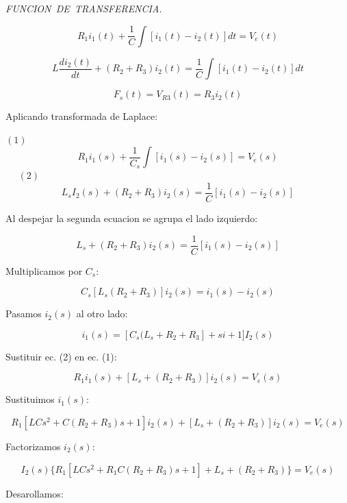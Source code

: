 \documentclass{article}%
\begin{document}
\emph{FUNCION\ DE\ TRANSFERENCIA.}%

\[
R_{1}i_{1}\left(  t\right)  +\frac{1}{C}\int\left[  i_{1}\left(  t\right)
-i_{2}\left(  t\right)  \right]  dt=V_{e}\left(  t\right)
\]
%

\[
L\frac{di_{2}\left(  t\right)  }{dt}+\left(  R_{2}+R_{3}\right)  i_{2}\left(
t\right)  =\frac{1}{C}\int\left[  i_{1}\left(  t\right)  -i_{2}\left(
t\right)  \right]  dt
\]
%

\[
F_{s}\left(  t\right)  =V_{R3}\left(  t\right)  =R_{3}i_{2}\left(  t\right)
\]


\bigskip Aplicando transformada de Laplace:

$\left(  1\right)  $%
\[
R_{1}i_{1}\left(  s\right)  +\frac{1}{C_{s}}\int\left[  i_{1}\left(  s\right)
-i_{2}\left(  s\right)  \right]  =V_{e}\left(  s\right)
\]
$\ \ \ \ \ \ \left(  2\right)  $%
\[
L_{s}I_{2}\left(  s\right)  +\left(  R_{2}+R_{3}\right)  i_{2}\left(
s\right)  =\frac{1}{C}\left[  i_{1}\left(  s\right)  -i_{2}\left(  s\right)
\right]
\]


Al despejar la segunda ecuacion se agrupa el lado izquierdo:%

\[
L_{s}+\left(  R_{2}+R_{3}\right)  i_{2}\left(  s\right)  =\frac{1}{C}\left[
i_{1}\left(  s\right)  -i_{2}\left(  s\right)  \right]
\]


Multiplicamos por $C_{s}:$%

\[
C_{s}[L_{s}\left(  R_{2}+R_{3}\right)  ]i_{2}\left(  s\right)  =i_{1}\left(
s\right)  -i_{2}\left(  s\right)
\]


Pasamos $i_{2}\left(  s\right)  $ al otro lado:%

\[
i_{1}\left(  s\right)  =[C_{s}(L_{s}+R_{2}+R_{3}]+si+1]I_{2}\left(  s\right)
\]


Sustituir ec. (2) en ec. (1):

\bigskip%

\[
R_{1}i_{1}\left(  s\right)  +[L_{s}+\left(  R_{2}+R_{3}\right)  ]i_{2}\left(
s\right)  =V_{e}\left(  s\right)
\]


Sustituimos $i_{1}\left(  s\right)  :$%

\[
R_{1}[LCs^{2}+C(R_{2}+R_{3})s+1]i_{2}\left(  s\right)  +[L_{s}+\left(
R_{2}+R_{3}\right)  ]i_{2}\left(  s\right)  =V_{e}\left(  s\right)
\]


Factorizamos $i_{2}\left(  s\right)  :$%

\[
I_{2}(s)\{R_{1}[LCs^{2}+R_{1}C(R_{2}+R_{3})s+1]+L_{s}+\left(  R_{2}%
+R_{3}\right)  \}=V_{e}\left(  s\right)
\]


Desarollamos:%
\end{document}
